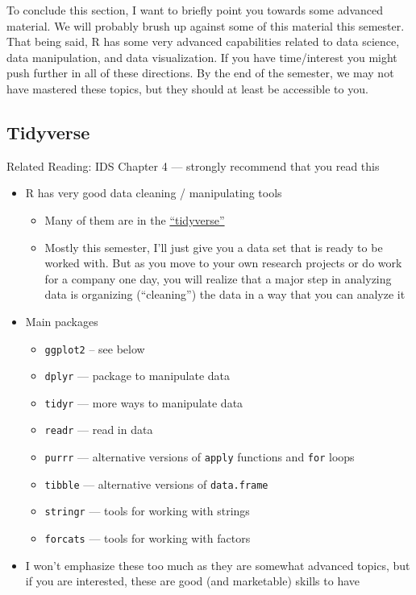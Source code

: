 \documentclass[
  letterpaper,
  DIV=11,
  numbers=noendperiod]{scrreprt}
\begin{document}
To conclude this section, I want to briefly point you towards some
advanced material. We will probably brush up against some of this
material this semester. That being said, R has some very advanced
capabilities related to data science, data manipulation, and data
visualization. If you have time/interest you might push further in all
of these directions. By the end of the semester, we may not have
mastered these topics, but they should at least be accessible to you.

\subsection{Tidyverse}\label{tidyverse}

Related Reading: IDS Chapter 4 --- strongly recommend that you read this

\begin{itemize}
\item
  R has very good data cleaning / manipulating tools

  \begin{itemize}
  \item
    Many of them are in the
    \href{https://www.tidyverse.org/}{``tidyverse''}
  \item
    Mostly this semester, I'll just give you a data set that is ready to
    be worked with. But as you move to your own research projects or do
    work for a company one day, you will realize that a major step in
    analyzing data is organizing (``cleaning'') the data in a way that
    you can analyze it
  \end{itemize}
\item
  Main packages

  \begin{itemize}
  \item
    \texttt{ggplot2} -- see below
  \item
    \texttt{dplyr} --- package to manipulate data
  \item
    \texttt{tidyr} --- more ways to manipulate data
  \item
    \texttt{readr} --- read in data
  \item
    \texttt{purrr} --- alternative versions of \texttt{apply} functions
    and \texttt{for} loops
  \item
    \texttt{tibble} --- alternative versions of \texttt{data.frame}
  \item
    \texttt{stringr} --- tools for working with strings
  \item
    \texttt{forcats} --- tools for working with factors
  \end{itemize}
\item
  I won't emphasize these too much as they are somewhat advanced topics,
  but if you are interested, these are good (and marketable) skills to
  have
\end{itemize}
\end{document}
